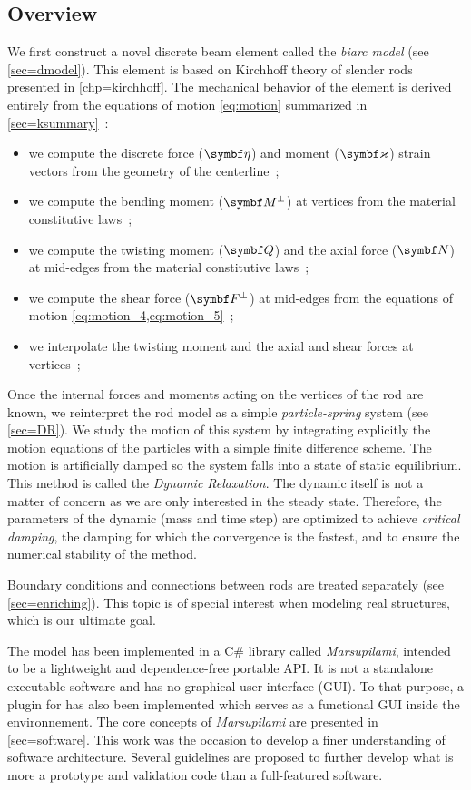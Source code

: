 \subsection{Overview}
We first construct a novel discrete beam element called the \emph{biarc model} (see \cref{sec=dmodel}). This element is based on Kirchhoff theory of slender rods presented in \cref{chp=kirchhoff}. The mechanical behavior of the element is derived entirely from the equations of motion \cref{eq:motion} summarized in \cref{sec=ksummary}~:
\begin{itemize}
\item we compute the discrete force ($\vect{\eta}$) and moment ($\vect{\varkappa}$) strain vectors from the geometry of the centerline~;
\item we compute the bending moment ($\vect{M}^{\perp}$) at vertices from the material constitutive laws~;
\item we compute the twisting moment ($\vect{Q}$) and the axial force ($\vect{N}$) at mid-edges from the material constitutive laws~;
\item we compute the shear force ($\vect{F}^{\perp}$) at mid-edges from the equations of motion \cref{eq:motion_4,eq:motion_5}~;
\item we interpolate the twisting moment and the axial and shear forces at vertices~;
\end{itemize}
Once the internal forces and moments acting on the vertices of the rod are known, we reinterpret the rod model as a simple \emph{particle-spring} system (see \cref{sec=DR}). We study the motion of this system by integrating explicitly the motion equations of the particles with a simple finite difference scheme. The motion is artificially damped so the system falls into a state of static equilibrium. This method is called the \emph{Dynamic Relaxation}. The dynamic itself is not a matter of concern as we are only interested in the steady state. Therefore, the parameters of the dynamic (mass and time step) are optimized to achieve \emph{critical damping}, the damping for which the convergence is the fastest, and to ensure the numerical stability of the method.

Boundary conditions and connections between rods are treated separately (see \cref{sec=enriching}). This topic is of special interest when modeling real structures, which is our ultimate goal.

The model has been implemented in a C\# library called \emph{Marsupilami}, intended to be a lightweight and dependence-free portable API. It is not a standalone executable software and has no graphical user-interface (GUI). To that purpose, a plugin for \grasshopper{} has also been implemented which serves as a functional GUI inside the \rhino{} environnement. The core concepts of \emph{Marsupilami} are presented in \cref{sec=software}. This work was the occasion to develop a finer understanding of software architecture. Several guidelines are proposed to further develop what is more a prototype and validation code than a full-featured software.

